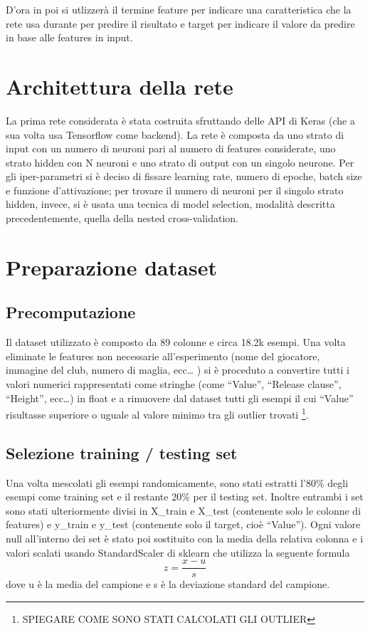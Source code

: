 \documentclass[12pt]{report}
\begin{document}
D'ora in poi si utlizzerà il termine feature per indicare una caratteristica che la rete usa durante per predire il risultato e target per indicare il valore da predire in base alle features in input.

\section{Architettura della rete}
La prima rete considerata è stata costruita sfruttando delle API di Keras (che a sua volta usa Tensorflow come backend). La rete è composta da uno strato di input con un numero di neuroni pari al numero di features considerate, uno strato hidden con N neuroni e uno strato di output con un singolo neurone. Per gli iper-parametri si è deciso di fissare learning rate, numero di epoche, batch size e funzione d'attivazione; per trovare il numero di neuroni per il singolo strato hidden, invece, si è usata una tecnica di model selection, modalità descritta precedentemente, quella della nested cross-validation.

\section{Preparazione dataset}
\subsection{Precomputazione}
Il dataset utilizzato è composto da 89 colonne e circa 18.2k esempi. Una volta eliminate le features non necessarie all’esperimento (nome del giocatore, immagine del club, numero di maglia, ecc… ) si è proceduto a convertire tutti i valori numerici rappresentati come stringhe (come “Value”, “Release clause”, “Height”, ecc…) in float e a rimuovere dal dataset tutti gli esempi il cui “Value” risultasse superiore o uguale al valore minimo tra gli outlier trovati \footnote{SPIEGARE COME SONO STATI CALCOLATI GLI OUTLIER}. 

\subsection{Selezione training / testing set}
Una volta mescolati gli esempi randomicamente, sono stati estratti l'80\% degli esempi come training set e il restante 20\% per il testing set. Inoltre entrambi i set sono stati ulteriormente divisi in X\_train e X\_test (contenente solo le colonne di features) e y\_train e y\_test (contenente solo il target, cioè “Value”). Ogni valore null all’interno dei set è stato poi sostituito con la media della relativa colonna e i valori scalati usando StandardScaler di sklearn che utilizza la seguente formula
$$z = \frac{x - u}{s}$$ 
dove u è la media del campione e s è la deviazione standard del campione.
\end{document}
